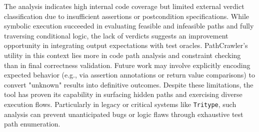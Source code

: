 \documentclass[12pt]{article}
\begin{document}
The analysis indicates high internal code coverage but limited external verdict classification due to insufficient assertions or postcondition specifications. While symbolic execution succeeded in evaluating feasible and infeasible paths and fully traversing conditional logic, the lack of verdicts suggests an improvement opportunity in integrating output expectations with test oracles. PathCrawler’s utility in this context lies more in code path analysis and constraint checking than in final correctness validation. Future work may involve explicitly encoding expected behavior (e.g., via assertion annotations or return value comparisons) to convert "unknown" results into definitive outcomes. Despite these limitations, the tool has proven its capability in surfacing hidden paths and exercising diverse execution flows. Particularly in legacy or critical systems like \texttt{Tritype}, such analysis can prevent unanticipated bugs or logic flaws through exhaustive test path enumeration.
\end{document}
